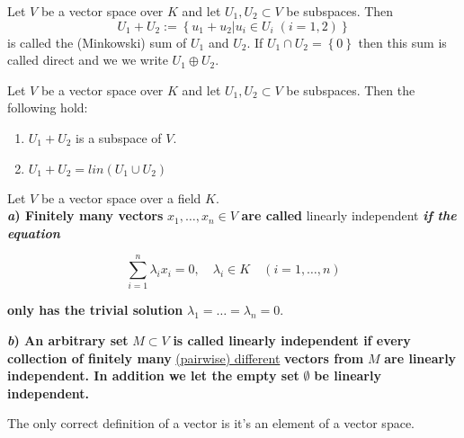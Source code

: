 \documentclass{tufte-handout}
\makeatletter
\renewcommand{\section}{\@startsection{section}%
    {3}{-1.01em}{-3ex \@plus -1ex \@minus -.2ex}%
    {1.5ex \@plus .2ex}
    {\hspace*{-5.5em}\fcolorbox{blue}{blue}{\parbox[c][1.0ex][b]{4em}{\phantom{space}}}
    \normalfont\Large\itshape\color{blue}}}
\makeatother
\begin{document}
\begin{Definition}
  Let \( V \) be a vector space over \( K \) and let \( U_1, U_2 \subset V  \)
  be subspaces. Then
  \[U_1 + U_2 := \left\{u_1 + u_2 | u_i \in U_i\; (i=1,2)\right\}\]
  is called the (Minkowski) sum of \( U_1 \) and \( U_2 \). If 
  \( U_1 \cap U_2 = \left\{0\right\}\) then this sum is called
  direct and we we write \( U_1 \oplus U_2 \).
\end{Definition}

\begin{Theorem}
  Let \( V \) be a vector space over \( K \) and let \( U_1, U_2 \subset V  \)
  be subspaces. Then the following hold:
\begin{enumerate}
    \item \( U_1 + U_2 \) is a subspace of \( V \).
    \item \( U_1 + U_2 = lin(U_1 \cup U_2)\) 
\end{enumerate}
\end{Theorem}


\begin{Definition}Let \( V \) be a vector space over a field \( K \).\\

\textbf{\textit{a}) Finitely many vectors} \( x_1, \dots, x_n \in V \) \textbf{are called} linearly independent \textbf{\textit{if the equation}}

\[
\sum_{i=1}^{n} \lambda_i x_i = 0, \quad \lambda_i \in K \quad (i = 1, \dots, n)
\]

\textbf{only has the trivial solution} \( \lambda_1 = \dots = \lambda_n = 0 \).

\textbf{\textit{b}) An arbitrary set} \( M \subset V \) \textbf{is called linearly independent if every collection of finitely many} \underline{(pairwise) different} \textbf{vectors from} \( M \) \textbf{are linearly independent. In addition we let the empty set} \( \emptyset \) \textbf{be linearly independent.}

\end{Definition}


The only correct definition of a vector is it's an element of a vector space.



\makeatletter
  \renewcommand{\section}{\@startsection{section}%
    {3}{0.8em}{-3ex \@plus -1ex \@minus -.2ex}%
    {1.5ex \@plus .2ex}
    {\hspace*{-5.5em}\fcolorbox{Periwinkle}{Periwinkle}{\parbox[c][1.0ex][b]{4em}{\phantom{space}}}
    \normalfont\Large\itshape\color{blue}}}
\makeatother



\end{document}
